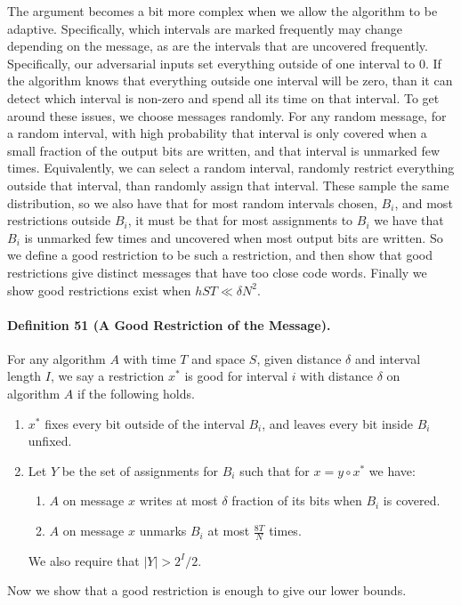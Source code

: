 \documentclass[10pt,a4paper]{article}
\begin{document}
The argument becomes a bit more complex when we allow the algorithm to be adaptive. Specifically, which intervals are marked frequently may change depending on the message, as are the intervals that are uncovered frequently. Specifically, our adversarial inputs set everything outside of one interval to 0. If the algorithm knows that everything outside one interval will be zero, than it can detect which interval is non-zero and spend all its time on that interval.
To get around these issues, we choose messages randomly. For any random message, for a random interval, with high probability that interval is only covered when a small fraction of the output bits are written, and that interval is unmarked few times. Equivalently, we can select a random interval, randomly restrict everything outside that interval, than randomly assign that interval. These sample the same distribution, so we also have that for most random intervals chosen, $B_i$, and most restrictions outside $B_i$, it must be that for most assignments to $B_i$ we have that $B_i$ is unmarked few times and uncovered when most output bits are written.
So we define a good restriction to be such a restriction, and then show that good restrictions give distinct messages that have too close code words. Finally we show good restrictions exist when $hST\ll\delta N^2$.
\paragraph{Definition 51 (A Good Restriction of the Message).} For any algorithm $A$ with time $T$ and space $S$, given distance $\delta$ and interval length $I$, we say a restriction $x^*$ is good for interval $i$ with distance $\delta$ on algorithm $A$ if the following holds.
\begin{enumerate}
\item $x^*$ fixes every bit outside of the interval $B_i$, and leaves every bit inside $B_i$ unfixed.
\item Let $Y$ be the set of assignments for $B_i$ such that for $x=y\circ x^*$ we have:
\begin{enumerate}\item $A$ on message $x$ writes at most $\delta$ fraction of its bits when $B_i$ is covered.\item $A$ on message $x$ unmarks $B_i$ at most $\frac{8T}N$ times.\end{enumerate}
We also require that $|Y|>2^I/2$.
\end{enumerate}
Now we show that a good restriction is enough to give our lower bounds.
\end{document}
